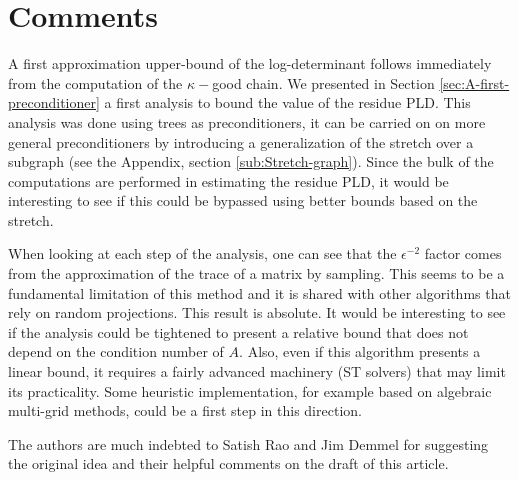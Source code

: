 
\section*{Comments}

A first approximation upper-bound of the log-determinant follows immediately
from the computation of the $\kappa-$good chain. We presented in
Section \ref{sec:A-first-preconditioner} a first analysis to bound
the value of the residue PLD. This analysis was done using trees as
preconditioners, it can be carried on on more general preconditioners
by introducing a generalization of the stretch over a subgraph (see
the Appendix, section \ref{sub:Stretch-graph}). Since the bulk of
the computations are performed in estimating the residue PLD, it would
be interesting to see if this could be bypassed using better bounds
based on the stretch.

When looking at each step of the analysis, one can see that the $\epsilon^{-2}$
factor comes from the approximation of the trace of a matrix by sampling.
This seems to be a fundamental limitation of this method and it is
shared with other algorithms that rely on random projections. This
result is absolute. It would be interesting to see if the analysis
could be tightened to present a relative bound that does not depend
on the condition number of $A$. Also, even if this algorithm presents
a linear bound, it requires a fairly advanced machinery (ST solvers)
that may limit its practicality. Some heuristic implementation, for
example based on algebraic multi-grid methods, could be a first step
in this direction.

The authors are much indebted to Satish Rao and Jim Demmel for suggesting
the original idea and their helpful comments on the draft of this
article.
